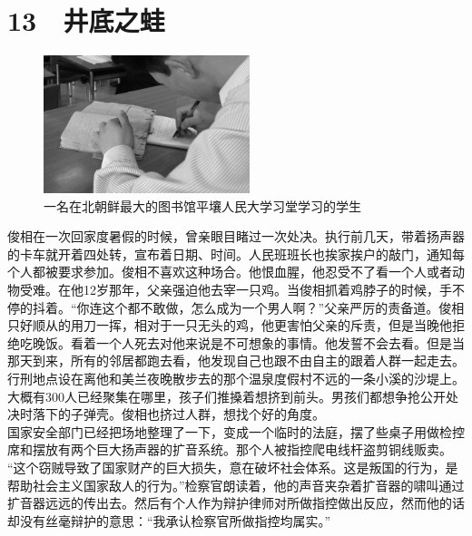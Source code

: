 \fancyhead[RO]{{\tiny{\textcolor{Gray}{\FA \ }}}\thepage}
\fancyhead[LE]{{\tiny{\textcolor{Gray}{\FA \ }}}\thepage}
\fancyfoot[LE,RO]{}
\fancyfoot[LO,CE]{}
\fancyfoot[CO,RE]{}
\chapter*{13 {\FA } 井底之蛙}
\begin{figure}[!htbp]
	\centering
	\includegraphics[width=6cm]{./Chapters/Images/13.jpg}
	\caption*{一名在北朝鲜最大的图书馆平壤人民大学习堂学习的学生}
\end{figure}


俊相在一次回家度暑假的时候，曾亲眼目睹过一次处决。执行前几天，带着扬声器的卡车就开着四处转，宣布着日期、时间。人民班班长也挨家挨户的敲门，通知每个人都被要求参加。俊相不喜欢这种场合。他恨血腥，他忍受不了看一个人或者动物受难。在他12岁那年，父亲强迫他去宰一只鸡。当俊相抓着鸡脖子的时候，手不停的抖着。“你连这个都不敢做，怎么成为一个男人啊？”父亲严厉的责备道。俊相只好顺从的用刀一挥，相对于一只无头的鸡，他更害怕父亲的斥责，但是当晚他拒绝吃晚饭。看着一个人死去对他来说是不可想象的事情。他发誓不会去看。但是当那天到来，所有的邻居都跑去看，他发现自己也跟不由自主的跟着人群一起走去。行刑地点设在离他和美兰夜晚散步去的那个温泉度假村不远的一条小溪的沙堤上。大概有300人已经聚集在哪里，孩子们推搡着想挤到前头。男孩们都想争抢公开处决时落下的子弹壳。俊相也挤过人群，想找个好的角度。\\

国家安全部门已经把场地整理了一下，变成一个临时的法庭，摆了些桌子用做检控席和摆放有两个巨大扬声器的扩音系统。那个人被指控爬电线杆盗剪铜线贩卖。\\

“这个窃贼导致了国家财产的巨大损失，意在破坏社会体系。这是叛国的行为，是帮助社会主义国家敌人的行为。”检察官朗读着，他的声音夹杂着扩音器的啸叫通过扩音器远远的传出去。然后有个人作为辩护律师对所做指控做出反应，然而他的话却没有丝毫辩护的意思：“我承认检察官所做指控均属实。”\\

